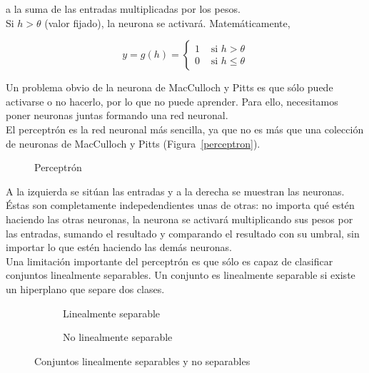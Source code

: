a la suma de las entradas multiplicadas por los pesos.\\

Si $h > \theta$ (valor fijado), la neurona se activará. Matemáticamente,

\begin{equation}
y = g(h) =
\begin{cases}
1 & \text{ si } h > \theta \\
0 & \text{ si } h  \leq \theta
\end{cases}
\end{equation}

Un problema obvio de la neurona de MacCulloch y Pitts es que sólo puede activarse o no hacerlo, por lo que no puede aprender. Para ello, necesitamos poner neuronas juntas formando una red neuronal.\\

El perceptrón es la red neuronal más sencilla, ya que no es más que una colección de neuronas de MacCulloch y Pitts (Figura~\ref{perceptron}).

\begin{figure}[htbp!]
	\centering
	\perceptron
	\label{fig:perceptron}
	\caption{Perceptrón}
\end{figure}

A la izquierda se sitúan las entradas y a la derecha se muestran las neuronas. Éstas son completamente indepedendientes unas de otras: no importa qué estén haciendo las otras neuronas, la neurona se activará multiplicando sus pesos por las entradas, sumando el resultado y comparando el resultado con su umbral, sin importar lo que estén haciendo las demás neuronas.\\

Una limitación importante del perceptrón es que sólo es capaz de clasificar conjuntos linealmente separables. Un conjunto es linealmente separable si existe un hiperplano que separe dos clases.

\begin{figure}[htbp!]
	\label{fig:linealmente_separable}
	\begin{center}
		\begin{subfigure}[b]{.40\textwidth}
			\centering
			\linealmenteseparable
			\caption{Linealmente separable}
		\end{subfigure}
		\begin{subfigure}[b]{.40\textwidth}
			\centering
			\nolinealmenteseparable
			\caption{No linealmente separable}
		\end{subfigure}
		
	\end{center}
	\caption{Conjuntos linealmente separables y no separables}
\end{figure}

